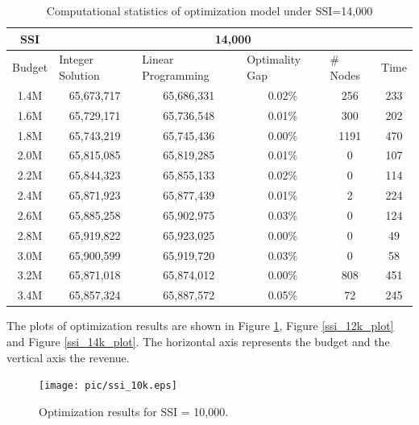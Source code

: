 \documentclass[12pt,english]{report}
\begin{document}
\begin{table}[H]
\centering
\caption{Computational statistics of optimization model under SSI=14,000}
\label{ssi14k}
\begin{tabular}{|c|c|c|c|c|c|}
\hline
SSI     & \multicolumn{5}{c|}{14,000}                      
\\ \hline
\multicolumn{1}{|l|}{Budget} & \multicolumn{1}{l|}{Integer Solution} &
\multicolumn{1}{l|}{Linear Programming} & \multicolumn{1}{l|}{Optimality Gap} &
\multicolumn{1}{l|}{\# Nodes} & \multicolumn{1}{l|}{Time} \\
\hline
1.4M    & 65,673,717     & 65,686,331 & 0.02\%       & 256    &233                \\ \hline
1.6M   & 65,729,171  & 65,736,548 & 0.01\%   & 300     &202                    \\ \hline
1.8M   & 65,743,219   & 65,745,436 & 0.00\%       & 1191   & 470                \\ \hline
2.0M  & 65,815,085   & 65,819,285 & 0.01\%   & 0  & 107                        \\ \hline
2.2M   & 65,844,323   & 65,855,133 & 0.02\%     & 0  & 114                      \\ \hline
2.4M   & 65,871,923   & 65,877,439 & 0.01\%     & 2   & 224                     \\ \hline
2.6M      & 65,885,258     & 65,902,975 & 0.03\%     & 0       & 124                 \\ \hline
2.8M   & 65,919,822      & 65,923,025 & 0.00\%   & 0      & 49                     \\ \hline
3.0M    & 65,900,599    & 65,919,720 & 0.03\%   & 0    & 58                       \\ \hline
3.2M  & 65,871,018    & 65,874,012 & 0.00\%  & 808    & 451                     \\ \hline
3.4M      & 65,857,324     & 65,887,572 & 0.05\%   & 72    & 245                     \\ \hline
\end{tabular}
\end{table}

The plots of optimization results are shown in Figure \ref{ssi_10k_plot}, Figure \ref{ssi_12k_plot} and Figure \ref{ssi_14k_plot}. The horizontal axis represents the budget and the vertical axis the revenue. 


\begin{figure}[ht]
    \centering
    \texttt{[image: pic/ssi\_10k.eps]}
    \caption{Optimization results for SSI = 10,000. }
     \label{ssi_10k_plot}
\end{figure}
\end{document}
